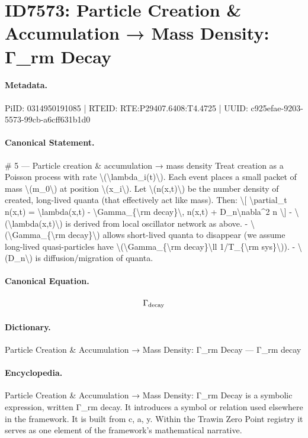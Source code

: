 \section*{ID7573: Particle Creation \& Accumulation → Mass Density: Γ\_rm Decay}
\paragraph{Metadata.}
PiID: 0314950191085 | RTEID: RTE:P29407.6408:T4.4725 | UUID: c925efae-9203-5573-99cb-a6cff631b1d0

\paragraph{Canonical Statement.}
\# 5 — Particle creation \& accumulation → mass density Treat creation as a Poisson process with rate \textbackslash{}(\textbackslash{}lambda\_i(t)\textbackslash{}). Each event places a small packet of mass \textbackslash{}(m\_0\textbackslash{}) at position \textbackslash{}(x\_i\textbackslash{}). Let \textbackslash{}(n(x,t)\textbackslash{}) be the number density of created, long-lived quanta (that effectively act like mass). Then: \textbackslash{}[ \textbackslash{}partial\_t n(x,t) = \textbackslash{}lambda(x,t) - \textbackslash{}Gamma\_\{\textbackslash{}rm decay\}\textbackslash{}, n(x,t) + D\_n\textbackslash{}nabla\textasciicircum{}2 n \textbackslash{}] - \textbackslash{}(\textbackslash{}lambda(x,t)\textbackslash{}) is derived from local oscillator network as above. - \textbackslash{}(\textbackslash{}Gamma\_\{\textbackslash{}rm decay\}\textbackslash{}) allows short-lived quanta to disappear (we assume long-lived quasi-particles have \textbackslash{}(\textbackslash{}Gamma\_\{\textbackslash{}rm decay\}\textbackslash{}ll 1/T\_\{\textbackslash{}rm sys\}\textbackslash{})). - \textbackslash{}(D\_n\textbackslash{}) is diffusion/migration of quanta.

\paragraph{Canonical Equation.}
\[
\Gamma_{\rm decay}
\]

\paragraph{Dictionary.}
Particle Creation \& Accumulation → Mass Density: Γ\_rm Decay — Γ\_rm decay

\paragraph{Encyclopedia.}
Particle Creation \& Accumulation → Mass Density: Γ\_rm Decay is a symbolic expression, written Γ\_rm decay. It introduces a symbol or relation used elsewhere in the framework. It is built from c, a, y. Within the Trawin Zero Point registry it serves as one element of the framework's mathematical narrative.
